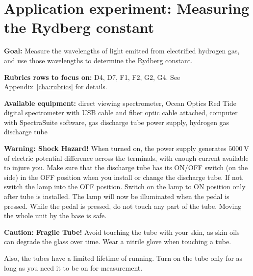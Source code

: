 \section{Application experiment: Measuring the Rydberg constant}\label{spec:sec:rydberg}

\textbf{Goal:} Measure the wavelengths of light emitted from electrified hydrogen gas, and use those wavelengths to determine the Rydberg constant.

\textbf{Rubrics rows to focus on:} D4, D7, F1, F2, G2, G4. See Appendix~\ref{cha:rubrics} for details.

\textbf{Available equipment:} direct viewing spectrometer, Ocean Optics Red Tide digital spectrometer with USB cable and fiber optic cable attached, computer with SpectraSuite software, gas discharge tube power supply, hydrogen gas discharge tube

\begin{framed}
 \textbf{Warning: Shock Hazard!} When turned on, the power supply generates $5000\:$V of electric potential difference across the terminals, with enough current available to injure you. Make sure that the discharge tube has its ON/OFF switch (on the side) in the
 OFF position when you install or change the discharge tube. If not, switch the lamp into
 the OFF position. Switch on the lamp to ON position only after tube is installed. The
 lamp will now be illuminated when the pedal is pressed. While the pedal is pressed, do not touch any part of the tube. Moving the
 whole unit by the base is safe.
\end{framed}

\begin{framed}
	\textbf{Caution: Fragile Tube!} Avoid touching the tube with your skin, as skin oils can degrade the glass over time. Wear a nitrile glove when touching a tube.
	
	Also, the tubes have a limited lifetime of running. Turn on the tube only for as long as you need it to be on for measurement.
\end{framed}

